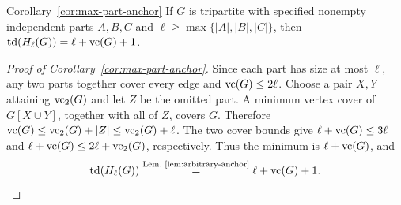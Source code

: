 \begin{restatedcorollary}{Corollary~\ref{cor:max-part-anchor}}
If $G$ is tripartite with specified nonempty independent parts $A,B,C$
and $\ell\geq\max\{|A|,|B|,|C|\}$, then
$\operatorname{td}(H_\ell(G))=\ell+\operatorname{vc}(G)+1$.
\end{restatedcorollary}

\begin{proof}[Proof of Corollary~\ref{cor:max-part-anchor}]
Since each part has size at most $\ell$, any two parts together
cover every edge and $\operatorname{vc}(G)\le2\ell$. Choose a pair $X,Y$
attaining $\operatorname{vc}_2(G)$ and let $Z$ be the omitted part. A minimum
vertex cover of $G[X\cup Y]$, together with all of $Z$, covers $G$.
Therefore $\operatorname{vc}(G)\le\operatorname{vc}_2(G)+|Z|\le\operatorname{vc}_2(G)+\ell$. The two
cover bounds give
$\ell+\operatorname{vc}(G)\le3\ell$ and
$\ell+\operatorname{vc}(G)\le2\ell+\operatorname{vc}_2(G)$, respectively. Thus the minimum
is $\ell+\operatorname{vc}(G)$, and
\[
 \operatorname{td}(H_\ell(G))
 \overset{\text{Lem.~\ref{lem:arbitrary-anchor}}}{=}
 \ell+\operatorname{vc}(G)+1.
\]
\end{proof}





